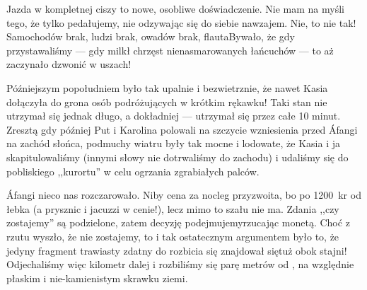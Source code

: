 
Jazda w kompletnej ciszy to nowe, osobliwe doświadczenie. Nie mam na myśli tego, że tylko pedałujemy, nie odzywając się do siebie nawzajem. Nie, to nie tak! Samochodów brak, ludzi brak, owadów brak, flauta\textellipsis By\-wało, że gdy przystawaliśmy --- gdy milkł chrzęst nienasmarowanych łańcuchów --- to aż zaczynało dzwonić w uszach!

Późniejszym popołudniem było tak upalnie i bezwietrznie, że nawet Kasia dołączyła do grona osób podróżujących w krótkim rękawku! Taki stan nie utrzymał się jednak długo, a dokładniej --- utrzymał się przez całe 10 minut. Zresztą gdy później Put i Karolina polowali na szczycie wzniesienia przed Áfangi na zachód słońca, podmuchy wiatru były tak mocne i lodowate, że Kasia i ja skapitulowaliśmy (innymi słowy nie dotrwaliśmy do zachodu) i udaliśmy się do pobliskiego ,,kurortu'' w celu ogrzania zgrabiałych palców.

Áfangi nieco nas rozczarowało. Niby cena za nocleg przyzwoita, bo po 1200~kr od łebka (a prysznic i jacuzzi w cenie!), lecz mimo to szału nie ma. Zdania ,,czy zostajemy'' są podzielone, zatem decyzję podejmujemy\textellipsis rzucając monetą. Choć z rzutu wyszło, że nie zostajemy, to i tak ostatecznym argumentem było to, że jedyny fragment trawiasty zdatny do rozbicia się znajdował się\textellipsis tuż obok stajni! Odjechaliśmy więc kilometr dalej i rozbiliśmy się parę metrów od , na względnie płaskim i nie-kamienistym skrawku ziemi.

